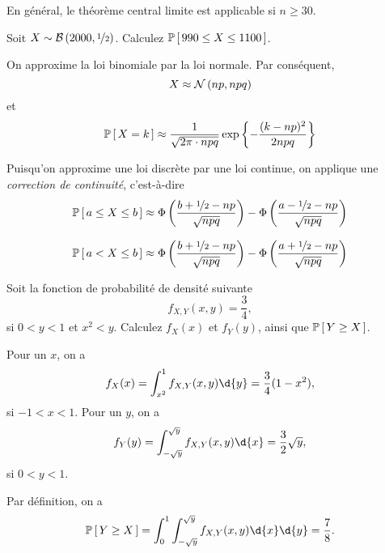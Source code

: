 \documentclass[11pt]{article}
\renewcommand\P[1]{%
	\ensuremath{%
		\mathbb{P}\left[\,#1\,\right]%
	}%
}%
\newcommand\Bin[2]{%
	\ensuremath{%
		\mathcal{B}\left(#1,#2\right)%
	}%
}%
\newcommand\Norm[2]{%
	\ensuremath{%
		\mathcal{N}\left(#1,#2\right)%
	}%
}%
\begin{document}
En général, le théorème central limite est applicable si $n\geq 30$.

\begin{exemple}
	Soit $X\sim\Bin{2000}{\nicefrac{1}{2}}$. Calculez $\P{990\leq X\leq 1100}$.

	On approxime la loi binomiale par la loi normale. Par conséquent,
	\begin{equation*}
		X\approx\Norm{np}{npq}
	\end{equation*}
	et
	\begin{equation*}
		\P{X=k}\approx\frac{1}{\sqrt{2\pi\cdot npq}}\exp\left\{
			-\frac{(k-np)^2}{2npq}
		\right\}
	\end{equation*}

	Puisqu'on approxime une loi discrète par une loi continue, on applique
	une \textit{correction de continuité}, c'est-à-dire
	\begin{equation*}
		\P{a\leq X\leq b}
		\approx\Phi\left(
			\frac{b+\nicefrac{1}{2}-np}{\sqrt{npq}}
		\right)-\Phi\left(
			\frac{a-\nicefrac{1}{2}-np}{\sqrt{npq}}
		\right)
	\end{equation*}

	\begin{equation*}
		\P{a<X\leq b}
		\approx\Phi\left(
			\frac{b+\nicefrac{1}{2}-np}{\sqrt{npq}}
		\right)-\Phi\left(
			\frac{a+\nicefrac{1}{2}-np}{\sqrt{npq}}
		\right)
	\end{equation*}
\end{exemple}

\begin{exemple}
	Soit la fonction de probabilité de densité suivante
	\begin{equation*}
		f_{X,Y}(x,y)=\frac{3}{4},
	\end{equation*}
	si $0<y<1$ et $x^2<y$. Calculez $f_X(x)$ et $f_Y(y)$, ainsi que
	$\P{Y\geq X}$.

	Pour un $x$, on a
	\begin{equation*}
		f_X(x)
		=\int_{x^2}^1f_{X,Y}(x,y)\d{y}
		=\frac{3}{4}(1-x^2),
	\end{equation*}
	si $-1<x<1$. Pour un $y$, on a
	\begin{equation*}
		f_Y(y)
		=\int_{-\sqrt{y}}^{\sqrt{y}}f_{X,Y}(x,y)\d{x}
		=\frac{3}{2}\sqrt{y},
	\end{equation*}
	si $0<y<1$.

	Par définition, on a
	\begin{equation*}
		\P{Y\geq X}
		=\int_0^1\int_{-\sqrt{y}}^{\sqrt{y}}f_{X,Y}(x,y)\d{x}\d{y}
		=\frac{7}{8}.
	\end{equation*}
\end{exemple}
\end{document}
